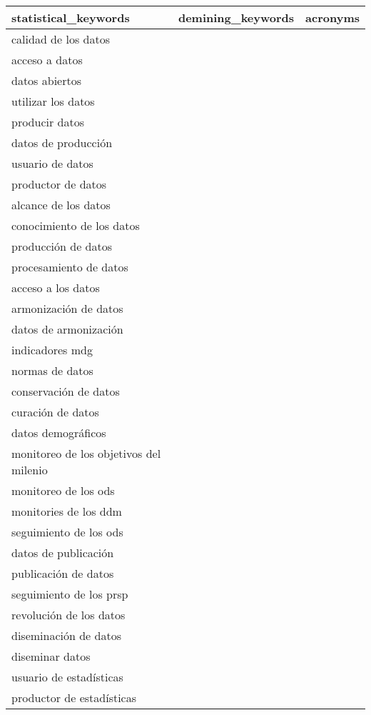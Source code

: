 \documentclass[
]{article}
\begin{document}
\begin{table}[H]
\centering\begingroup\fontsize{10}{12}\selectfont

\begin{tabular}{l|l|l}
\hline
statistical\_keywords & demining\_keywords & acronyms\\
\hline
calidad de los datos &  & \\
\hline
acceso a datos &  & \\
\hline
datos abiertos &  & \\
\hline
utilizar los datos &  & \\
\hline
producir datos &  & \\
\hline
datos de producción &  & \\
\hline
usuario de datos &  & \\
\hline
productor de datos &  & \\
\hline
alcance de los datos &  & \\
\hline
conocimiento de los datos &  & \\
\hline
producción de datos &  & \\
\hline
procesamiento de datos &  & \\
\hline
acceso a los datos &  & \\
\hline
armonización de datos &  & \\
\hline
datos de armonización &  & \\
\hline
indicadores mdg &  & \\
\hline
normas de datos &  & \\
\hline
conservación de datos &  & \\
\hline
curación de datos &  & \\
\hline
datos demográficos &  & \\
\hline
monitoreo de los objetivos del milenio &  & \\
\hline
monitoreo de los ods &  & \\
\hline
monitories de los ddm &  & \\
\hline
seguimiento de los ods &  & \\
\hline
datos de publicación &  & \\
\hline
publicación de datos &  & \\
\hline
seguimiento de los prsp &  & \\
\hline
revolución de los datos &  & \\
\hline
diseminación de datos &  & \\
\hline
diseminar datos &  & \\
\hline
usuario de estadísticas &  & \\
\hline
productor de estadísticas &  & \\
\hline
\end{tabular}
\endgroup{}
\end{table}
\end{document}
